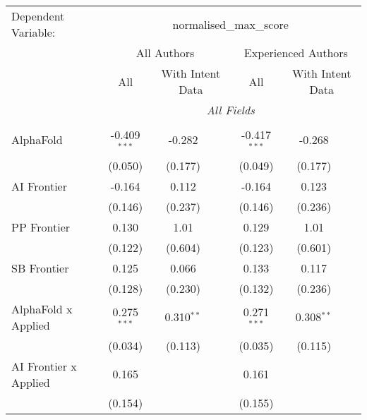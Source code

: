 \begingroup
\centering
\begin{tabular}{lcccccc}
   \tabularnewline \midrule \midrule
   Dependent Variable: & \multicolumn{6}{c}{normalised\_max\_score}\\
 & \multicolumn{3}{c}{All Authors} & \multicolumn{3}{c}{Experienced Authors} \\
\cmidrule(lr){2-4} \cmidrule(lr){5-7}
 & \multicolumn{1}{c}{All} & \multicolumn{2}{c}{With Intent Data} & \multicolumn{1}{c}{All} & \multicolumn{2}{c}{With Intent Data} \\
\cmidrule(lr){2-2} \cmidrule(lr){3-4} \cmidrule(lr){5-5} \cmidrule(lr){6-7}
 & \multicolumn{6}{c}{\textit{All Fields}} \\ \\
   AlphaFold                      & -0.409$^{***}$ & -0.282       &               & -0.417$^{***}$ & -0.268       &   \\   
                                  & (0.050)        & (0.177)      &               & (0.049)        & (0.177)      &   \\   
   AI Frontier                    & -0.164         & 0.112        &               & -0.164         & 0.123        &   \\   
                                  & (0.146)        & (0.237)      &               & (0.146)        & (0.236)      &   \\   
   PP Frontier                    & 0.130          & 1.01         &               & 0.129          & 1.01         &   \\   
                                  & (0.122)        & (0.604)      &               & (0.123)        & (0.601)      &   \\   
   SB Frontier                    & 0.125          & 0.066        &               & 0.133          & 0.117        &   \\   
                                  & (0.128)        & (0.230)      &               & (0.132)        & (0.236)      &   \\   
   AlphaFold x Applied            & 0.275$^{***}$  & 0.310$^{**}$ &               & 0.271$^{***}$  & 0.308$^{**}$ &   \\   
                                  & (0.034)        & (0.113)      &               & (0.035)        & (0.115)      &   \\   
   AI Frontier x Applied          & 0.165          &              &               & 0.161          &              &   \\   
                                  & (0.154)        &              &               & (0.155)        &              &   \\   

\end{tabular}
